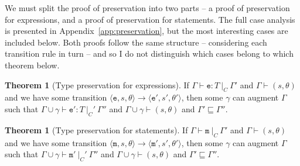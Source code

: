 \documentclass[12pt,a4paper,twoside,openright]{report}
\theoremstyle{definition}
\theoremstyle{dotless}
\newtheorem{theorem}[definition]{Theorem}
\newcommand{\transition}[6]{\langle{}\mathtt{#1},#2,#3\rangle{}\rightarrow{}\langle{}\mathtt{#4},#5,#6\rangle}
\begin{document}
We must split the proof of preservation into two parts -- a proof of
preservation for expressions, and a proof of preservation for statements. The
full case analysis is presented in Appendix~\ref{app:preservation}, but the
most interesting cases are included below. Both proofs follow the same
structure -- considering each transition rule in turn -- and so I do not
distinguish which cases belong to which theorem below.

\begin{theorem}[Type preservation for expressions]\label{expPreservation}
  If $\Gamma\vdash \mathtt{e}:T\ |_C\ \Gamma'$ and $\Gamma\vdash(s, \theta)$ and we have some
  transition $\transition{e}{s}{\theta}{e'}{s'}{\theta'}$, then some $\gamma$ can augment $\Gamma$ such that
  $\Gamma\!\cup\!\gamma\vdash\mathtt{e'}:T\ |_C'\ \Gamma''$ and $\Gamma\!\cup\!\gamma\vdash(s,\theta)$ and
  $\Gamma'\sqsubseteq\Gamma''$.
\end{theorem}
\begin{theorem}[Type preservation for statements]\label{mPreservation}
  If $\Gamma\vdash \mathtt{m}\ |_C\ \Gamma'$ and $\Gamma\vdash(s, \theta)$ and we have some
  transition $\transition{m}{s}{\theta}{m'}{s'}{\theta'}$, then some $\gamma$ can augment $\Gamma$ such that
  $\Gamma\!\cup\!\gamma\vdash\mathtt{m'}\ |_C'\ \Gamma''$ and $\Gamma\!\cup\!\gamma\vdash(s,\theta)$ and 
  $\Gamma'\sqsubseteq\Gamma''$.
\end{theorem}
\end{document}
